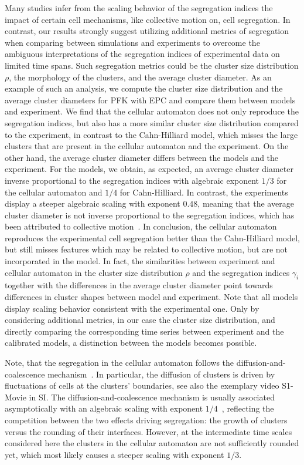 \documentclass[10pt,letterpaper]{article}
\begin{document}
Many studies infer from the scaling behavior of the segregation
indices the impact of certain cell mechanisms, like collective motion on,
cell segregation. In contrast, our results strongly suggest utilizing
additional metrics of segregation when comparing between simulations and
experiments to overcome the ambiguous interpretations of the
segregation indices of experimental data on limited time spans. Such
segregation metrics could be the cluster size distribution $\rho$, the morphology
of the clusters, and the average cluster diameter. As an example of such
an analysis, we compute the cluster size distribution and the average cluster
diameters for PFK with EPC and compare them between models and
experiment. We find that the cellular automaton does not only
reproduce the segregation indices, but also has a more similar cluster
size distribution compared to the experiment, in contrast to the Cahn-Hilliard
model, which misses the large clusters that are present in the
cellular automaton and the experiment. On the other hand, the average
cluster diameter differs between the models and the experiment. For
the models, we obtain, as expected, an average cluster diameter inverse
proportional to the segregation indices with algebraic exponent $1/3$
for the cellular automaton and $1/4$ for Cahn-Hilliard. In contrast,
the experiments display a steeper algebraic scaling with exponent
$0.48$, meaning that the average cluster diameter is not inverse
proportional to the segregation indices, which has been attributed to
collective motion~\cite{MehMonNemVic2012}. In conclusion, the cellular
automaton reproduces the experimental cell segregation better than the
Cahn-Hilliard model, but still misses features which may be related to
collective motion, but are not incorporated in the model. In fact,
the similarities between experiment and cellular automaton in the
cluster size distribution $\rho$ and the segregation indices $\gamma_i$ together with
the differences in the average cluster diameter point towards
differences in cluster shapes between model and experiment.
Note that all models display scaling behavior consistent with the
experimental one. Only by considering additional metrics, in our case
the cluster size distribution, and directly comparing the corresponding
time series between experiment and the calibrated models, a distinction
between the models becomes possible.

Note, that the segregation in the cellular automaton follows the
diffusion-and-coalescence mechanism~\cite{BerBraHaa2018}. In
particular, the diffusion of clusters is driven by fluctuations of
cells at the clusters' boundaries, see also the exemplary video
S1-Movie in SI. The diffusion-and-coalescence mechanism is usually
associated asymptotically with an algebraic scaling with exponent
$1/4$~\cite{BerBraHaa2018, Dur2021, Kra2020, BeaAlmBru2017,
  NakIsh2011}, reflecting the competition between the two effects
driving segregation: the growth of clusters versus the rounding of
their interfaces. However, at the intermediate time scales considered
here the clusters in the cellular automaton are not sufficiently
rounded yet, which most likely causes a steeper scaling with exponent
$1/3$.
\end{document}

